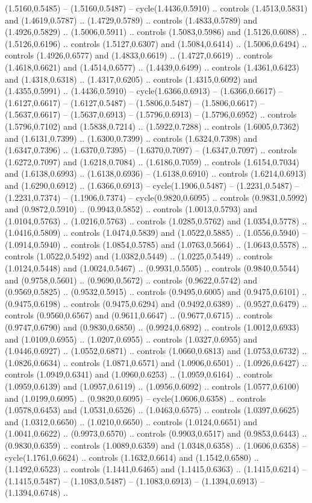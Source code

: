{(1.5160,0.5485) -- (1.5160,0.5487) -- cycle(1.4436,0.5910) .. controls (1.4513,0.5831) and (1.4619,0.5787) .. (1.4729,0.5789) .. controls (1.4833,0.5789) and (1.4926,0.5829) .. (1.5006,0.5911) .. controls (1.5083,0.5986) and (1.5126,0.6088) .. (1.5126,0.6196) .. controls (1.5127,0.6307) and (1.5084,0.6414) .. (1.5006,0.6494) .. controls (1.4926,0.6577) and (1.4833,0.6619) .. (1.4727,0.6619) .. controls (1.4618,0.6621) and (1.4514,0.6577) .. (1.4439,0.6499) .. controls (1.4361,0.6423) and (1.4318,0.6318) .. (1.4317,0.6205) .. controls (1.4315,0.6092) and (1.4355,0.5991) .. (1.4436,0.5910) -- cycle(1.6366,0.6913) -- (1.6366,0.6617) -- (1.6127,0.6617) -- (1.6127,0.5487) -- (1.5806,0.5487) -- (1.5806,0.6617) -- (1.5637,0.6617) -- (1.5637,0.6913) -- (1.5796,0.6913) -- (1.5796,0.6952) .. controls (1.5796,0.7102) and (1.5838,0.7214) .. (1.5922,0.7288) .. controls (1.6005,0.7362) and (1.6131,0.7399) .. (1.6300,0.7399) .. controls (1.6324,0.7398) and (1.6347,0.7396) .. (1.6370,0.7395) -- (1.6370,0.7097) -- (1.6347,0.7097) .. controls (1.6272,0.7097) and (1.6218,0.7084) .. (1.6186,0.7059) .. controls (1.6154,0.7034) and (1.6138,0.6993) .. (1.6138,0.6936) -- (1.6138,0.6910) .. controls (1.6214,0.6913) and (1.6290,0.6912) .. (1.6366,0.6913) -- cycle(1.1906,0.5487) -- (1.2231,0.5487) -- (1.2231,0.7374) -- (1.1906,0.7374) -- cycle(0.9820,0.6095) .. controls (0.9831,0.5992) and (0.9872,0.5910) .. (0.9943,0.5852) .. controls (1.0013,0.5793) and (1.0104,0.5763) .. (1.0216,0.5763) .. controls (1.0285,0.5762) and (1.0354,0.5778) .. (1.0416,0.5809) .. controls (1.0474,0.5839) and (1.0522,0.5885) .. (1.0556,0.5940) -- (1.0914,0.5940) .. controls (1.0854,0.5785) and (1.0763,0.5664) .. (1.0643,0.5578) .. controls (1.0522,0.5492) and (1.0382,0.5449) .. (1.0225,0.5449) .. controls (1.0124,0.5448) and (1.0024,0.5467) .. (0.9931,0.5505) .. controls (0.9840,0.5544) and (0.9758,0.5601) .. (0.9690,0.5672) .. controls (0.9622,0.5742) and (0.9569,0.5825) .. (0.9532,0.5915) .. controls (0.9495,0.6005) and (0.9475,0.6101) .. (0.9475,0.6198) .. controls (0.9475,0.6294) and (0.9492,0.6389) .. (0.9527,0.6479) .. controls (0.9560,0.6567) and (0.9611,0.6647) .. (0.9677,0.6715) .. controls (0.9747,0.6790) and (0.9830,0.6850) .. (0.9924,0.6892) .. controls (1.0012,0.6933) and (1.0109,0.6955) .. (1.0207,0.6955) .. controls (1.0327,0.6955) and (1.0446,0.6927) .. (1.0552,0.6871) .. controls (1.0660,0.6813) and (1.0753,0.6732) .. (1.0826,0.6634) .. controls (1.0871,0.6571) and (1.0906,0.6501) .. (1.0926,0.6427) .. controls (1.0949,0.6341) and (1.0960,0.6253) .. (1.0959,0.6164) .. controls (1.0959,0.6139) and (1.0957,0.6119) .. (1.0956,0.6092) .. controls (1.0577,0.6100) and (1.0199,0.6095) .. (0.9820,0.6095) -- cycle(1.0606,0.6358) .. controls (1.0578,0.6453) and (1.0531,0.6526) .. (1.0463,0.6575) .. controls (1.0397,0.6625) and (1.0312,0.6650) .. (1.0210,0.6650) .. controls (1.0124,0.6651) and (1.0041,0.6622) .. (0.9973,0.6570) .. controls (0.9903,0.6517) and (0.9853,0.6443) .. (0.9830,0.6359) .. controls (1.0089,0.6359) and (1.0348,0.6358) .. (1.0606,0.6358) -- cycle(1.1761,0.6624) .. controls (1.1632,0.6614) and (1.1542,0.6580) .. (1.1492,0.6523) .. controls (1.1441,0.6465) and (1.1415,0.6363) .. (1.1415,0.6214) -- (1.1415,0.5487) -- (1.1083,0.5487) -- (1.1083,0.6913) -- (1.1394,0.6913) -- (1.1394,0.6748) .. }

